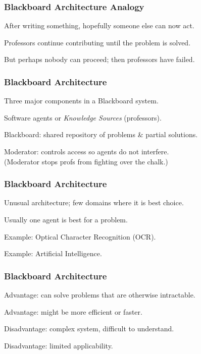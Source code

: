 \begin{frame}
\frametitle{Blackboard Architecture Analogy}

\begin{changemargin}{1cm}
After writing something, hopefully someone else can now act.

Professors continue contributing until the problem is solved.

But perhaps nobody can proceed; then professors have failed.

\end{changemargin}
\end{frame}

\begin{frame}
\frametitle{Blackboard Architecture}

\begin{changemargin}{1cm}
Three major components in a Blackboard system.

Software agents or \textit{Knowledge Sources} (professors).

Blackboard: shared repository of problems \& partial solutions.

Moderator: controls access so agents do not interfere.\\
	\quad (Moderator stops profs from fighting over the chalk.)

\end{changemargin}
\end{frame}

\begin{frame}
\frametitle{Blackboard Architecture}

\begin{changemargin}{1cm}
Unusual architecture; few domains where it is best choice.

Usually one agent is best for a problem.

Example: Optical Character Recognition (OCR).

Example: Artificial Intelligence.

\end{changemargin}
\end{frame}


\begin{frame}
\frametitle{Blackboard Architecture}

\begin{changemargin}{1cm}
Advantage: can solve problems that are otherwise intractable. 

Advantage: might be more efficient or faster.

Disadvantage: complex system, difficult to understand.

Disadvantage: limited applicability.

\end{changemargin}
\end{frame}


